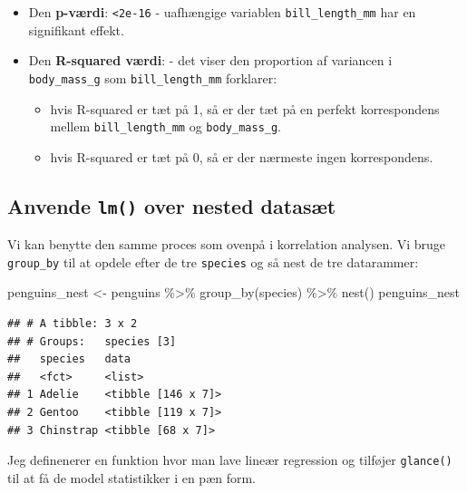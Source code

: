 \documentclass[
]{book}
\newenvironment{Shaded}{\begin{snugshade}}{\end{snugshade}}
\newcommand{\FunctionTok}[1]{\textcolor[rgb]{0.00,0.00,0.00}{#1}}
\newcommand{\NormalTok}[1]{#1}
\newcommand{\OtherTok}[1]{\textcolor[rgb]{0.56,0.35,0.01}{#1}}
\newcommand{\SpecialCharTok}[1]{\textcolor[rgb]{0.00,0.00,0.00}{#1}}
\providecommand{\tightlist}{%
  \setlength{\itemsep}{0pt}\setlength{\parskip}{0pt}}
\begin{document}
\begin{itemize}
\tightlist
\item
  Den \textbf{p-værdi}: \texttt{\textless{}2e-16} - uafhængige variablen \texttt{bill\_length\_mm} har en signifikant effekt.
\item
  Den \textbf{R-squared værdi}: - det viser den proportion af variancen i \texttt{body\_mass\_g} som \texttt{bill\_length\_mm} forklarer:

  \begin{itemize}
  \tightlist
  \item
    hvis R-squared er tæt på 1, så er der tæt på en perfekt korrespondens mellem \texttt{bill\_length\_mm} og \texttt{body\_mass\_g}.
  \item
    hvis R-squared er tæt på 0, så er der nærmeste ingen korrespondens.
  \end{itemize}
\end{itemize}

\hypertarget{anvende-lm-over-nested-datasuxe6t}{%
\subsection{\texorpdfstring{Anvende \texttt{lm()} over nested datasæt}{Anvende lm() over nested datasæt}}\label{anvende-lm-over-nested-datasuxe6t}}

Vi kan benytte den samme proces som ovenpå i korrelation analysen. Vi bruge \texttt{group\_by} til at opdele efter de tre \texttt{species} og så nest de tre datarammer:

\begin{Shaded}
\begin{Highlighting}[]
\NormalTok{penguins\_nest }\OtherTok{\textless{}{-}}\NormalTok{ penguins }\SpecialCharTok{\%\textgreater{}\%} 
  \FunctionTok{group\_by}\NormalTok{(species) }\SpecialCharTok{\%\textgreater{}\%}
  \FunctionTok{nest}\NormalTok{()}
\NormalTok{penguins\_nest}
\end{Highlighting}
\end{Shaded}

\begin{verbatim}
## # A tibble: 3 x 2
## # Groups:   species [3]
##   species   data              
##   <fct>     <list>            
## 1 Adelie    <tibble [146 x 7]>
## 2 Gentoo    <tibble [119 x 7]>
## 3 Chinstrap <tibble [68 x 7]>
\end{verbatim}

Jeg definenerer en funktion hvor man lave lineær regression og tilføjer \texttt{glance()} til at få de model statistikker i en pæn form.
\end{document}
